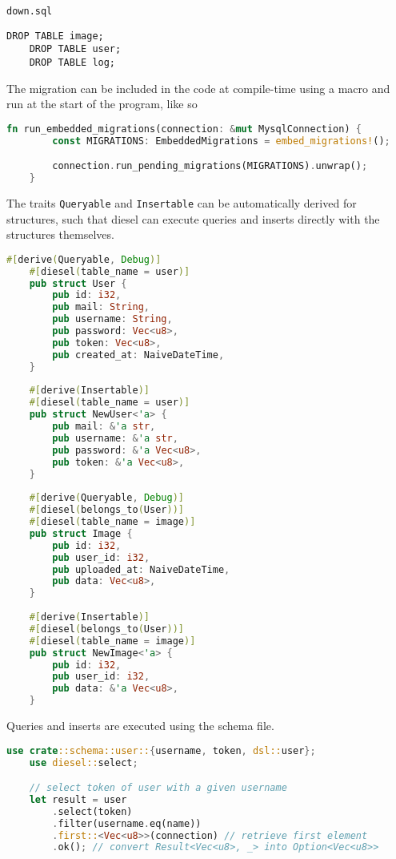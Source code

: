 \documentclass[../documentation.tex]{subfiles}
\begin{document}
\texttt{down.sql}
\begin{lstlisting}[style=sql]
    DROP TABLE image;
    DROP TABLE user;
    DROP TABLE log;
\end{lstlisting}

The migration can be included in the code at compile-time using a macro and run
at the start of the program, like so
\begin{lstlisting}[language=Rust, style=boxed, numbers=none]
    fn run_embedded_migrations(connection: &mut MysqlConnection) {
        const MIGRATIONS: EmbeddedMigrations = embed_migrations!();

        connection.run_pending_migrations(MIGRATIONS).unwrap();
    }
\end{lstlisting}

The traits \texttt{Queryable} and \texttt{Insertable} can be automatically derived
for structures, such that diesel can execute queries and inserts directly with the structures
themselves.

\pagebreak

\begin{lstlisting}[language=Rust, style=boxed, numbers=none]
    #[derive(Queryable, Debug)]
    #[diesel(table_name = user)]
    pub struct User {
        pub id: i32,
        pub mail: String,
        pub username: String,
        pub password: Vec<u8>,
        pub token: Vec<u8>,
        pub created_at: NaiveDateTime,
    }
    
    #[derive(Insertable)]
    #[diesel(table_name = user)]
    pub struct NewUser<'a> {
        pub mail: &'a str,
        pub username: &'a str,
        pub password: &'a Vec<u8>,
        pub token: &'a Vec<u8>,
    }
    
    #[derive(Queryable, Debug)]
    #[diesel(belongs_to(User))]
    #[diesel(table_name = image)]
    pub struct Image {
        pub id: i32,
        pub user_id: i32,
        pub uploaded_at: NaiveDateTime,
        pub data: Vec<u8>,
    }
    
    #[derive(Insertable)]
    #[diesel(belongs_to(User))]
    #[diesel(table_name = image)]
    pub struct NewImage<'a> {
        pub id: i32,
        pub user_id: i32,
        pub data: &'a Vec<u8>,
    }
\end{lstlisting}

Queries and inserts are executed using the schema file.

\begin{lstlisting}[language=Rust, style=boxed, numbers=none]
    use crate::schema::user::{username, token, dsl::user};
    use diesel::select;

    // select token of user with a given username
    let result = user
        .select(token)
        .filter(username.eq(name))
        .first::<Vec<u8>>(connection) // retrieve first element
        .ok(); // convert Result<Vec<u8>, _> into Option<Vec<u8>>
\end{lstlisting}
\end{document}
